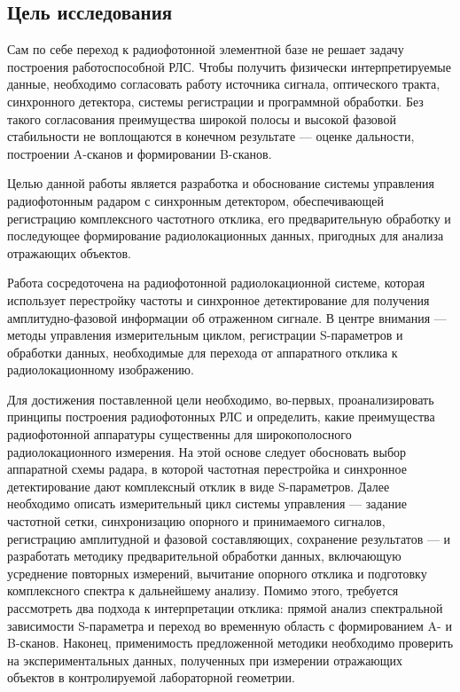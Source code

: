 \subsection{Цель исследования}

Сам по себе переход к радиофотонной элементной базе не решает задачу построения
работоспособной РЛС. Чтобы получить физически интерпретируемые данные, необходимо
согласовать работу источника сигнала, оптического тракта, синхронного детектора,
системы регистрации и программной обработки. Без такого согласования преимущества
широкой полосы и высокой фазовой стабильности не воплощаются в конечном
результате --- оценке дальности, построении A-сканов и формировании B-сканов.

Целью данной работы является разработка и обоснование системы управления
радиофотонным радаром с синхронным детектором, обеспечивающей регистрацию
комплексного частотного отклика, его предварительную обработку и последующее
формирование радиолокационных данных, пригодных для анализа отражающих объектов.

Работа сосредоточена на радиофотонной радиолокационной системе, которая использует
перестройку частоты и синхронное детектирование для получения амплитудно-фазовой
информации об отраженном сигнале. В центре внимания --- методы управления
измерительным циклом, регистрации S-параметров и обработки данных, необходимые
для перехода от аппаратного отклика к радиолокационному изображению.

Для достижения поставленной цели необходимо, во-первых, проанализировать принципы
построения радиофотонных РЛС и определить, какие преимущества радиофотонной
аппаратуры существенны для широкополосного радиолокационного измерения. На этой
основе следует обосновать выбор аппаратной схемы радара, в которой частотная
перестройка и синхронное детектирование дают комплексный отклик в виде
S-параметров. Далее необходимо описать измерительный цикл системы управления ---
задание частотной сетки, синхронизацию опорного и принимаемого сигналов,
регистрацию амплитудной и фазовой составляющих, сохранение результатов --- и
разработать методику предварительной обработки данных, включающую усреднение
повторных измерений, вычитание опорного отклика и подготовку комплексного спектра
к дальнейшему анализу. Помимо этого, требуется рассмотреть два подхода к
интерпретации отклика: прямой анализ спектральной зависимости S-параметра и
переход во временную область с формированием A- и B-сканов. Наконец, применимость
предложенной методики необходимо проверить на экспериментальных данных, полученных
при измерении отражающих объектов в контролируемой лабораторной геометрии.

